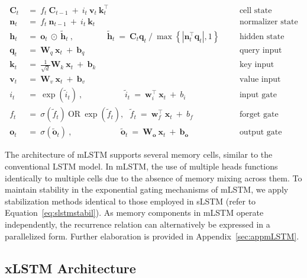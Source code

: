 \begin{align}
\label{eq:mlstm_recurrent_begin}
\mathbf{C}_t \ &= \  f_t \ \mathbf{C}_{t-1} \ + \ 
  i_t \ \mathbf{v}_t \ \mathbf{k}_t^\top & &  &\text{cell state} \\
\mathbf{n}_t \ &= \  f_t \ \mathbf{n}_{t-1} \ + \ 
  i_t \ \mathbf{k}_t & &  &\text{normalizer state} \\
\mathbf{h}_t  \ &= \ \mathbf{o}_t \ \odot \ \tilde{\mathbf{h}}_t
\ , \qquad \qquad 
\tilde{\mathbf{h}}_t \ = \   \mathbf{C}_t \mathbf{q}_t \ / \ 
  \max \left\{ |\mathbf{n}_t^\top \mathbf{q}_t|, 1 \right\} 
   &&&\text{hidden state} \\
\mathbf{q}_t \ &= \ \mathbf{W}_q \ \mathbf{x}_t \ + \ \mathbf{b}_q  & &  &\text{query input} \\
\mathbf{k}_t \ &= \ \frac{1}{\sqrt{d}} \mathbf{W}_k \ \mathbf{x}_t \ + \ \mathbf{b}_k  & &  &\text{key input} \\
\mathbf{v}_t \ &= \ \mathbf{W}_v \ \mathbf{x}_t \ + \ \mathbf{b}_v  & &  &\text{value input} \\
i_t \ &= \ \!\exp \!  \! \left( \tilde{i}_t  \right) \ , 
 \qquad \qquad \ \ \ \ \,
  \tilde{i}_t \ = \ \mathbf{w}^\top_{i} \ \mathbf{x}_t \ + \  b_{i} \ \ \ 
  &&&\text{input gate} \\
f_t \ &= \ \sigma \!  \left(  \tilde{f}_t \right) \ \text{OR} \ \!\exp \!  \! \left(  \tilde{f}_t \right) , \ \ \: \!
\tilde{f}_t \ = \ \mathbf{w}^\top_{f} \ \mathbf{x}_t  \ + \
  b_{f}
  &&& \text{forget gate} \\
\label{eq:mlstm_recurrent_end}
\mathbf{o}_t \ &= \ \sigma \left( \tilde{\mathbf{o}}_t \right) \ , \qquad \qquad \quad \ \ \ \,
  \tilde{\mathbf{o}}_t  \ = \ \mathbf{W}_{\mathbf{o}} \ \mathbf{x}_t \ + \
  \mathbf{b}_{\mathbf{o}}
  &&&\text{output gate} 
\end{align}

The architecture of mLSTM supports several memory cells, similar to the conventional LSTM model. In mLSTM, the use of multiple heads functions identically to multiple cells due to the absence of memory mixing across them. To maintain stability in the exponential gating mechanisms of mLSTM, we apply stabilization methods identical to those employed in sLSTM (refer to Equation~\ref{eq:slstmstabil}). As memory components in mLSTM operate independently, the recurrence relation can alternatively be expressed in a parallelized form. Further elaboration is provided in Appendix~\ref{sec:appmLSTM}.

\subsection{xLSTM Architecture}
\label{sec:xLSTMarch}

